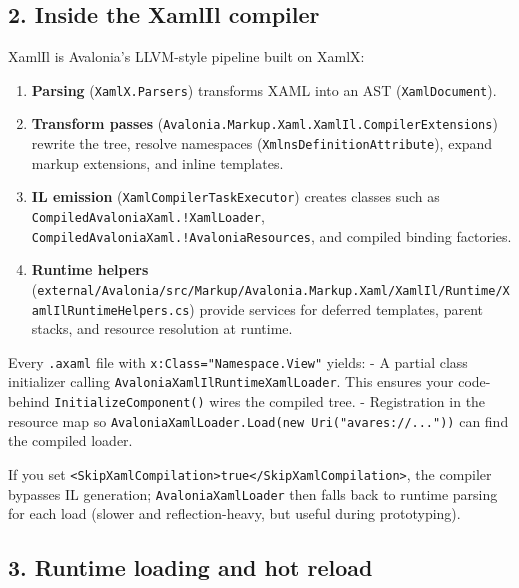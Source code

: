 \subsection{2. Inside the XamlIl
compiler}\label{inside-the-xamlil-compiler}

XamlIl is Avalonia's LLVM-style pipeline built on XamlX:

\begin{enumerate}
\def\labelenumi{\arabic{enumi}.}
\tightlist
\item
  \textbf{Parsing} (\passthrough{\lstinline!XamlX.Parsers!}) transforms
  XAML into an AST (\passthrough{\lstinline!XamlDocument!}).
\item
  \textbf{Transform passes}
  (\passthrough{\lstinline!Avalonia.Markup.Xaml.XamlIl.CompilerExtensions!})
  rewrite the tree, resolve namespaces
  (\passthrough{\lstinline!XmlnsDefinitionAttribute!}), expand markup
  extensions, and inline templates.
\item
  \textbf{IL emission}
  (\passthrough{\lstinline!XamlCompilerTaskExecutor!}) creates classes
  such as \passthrough{\lstinline"CompiledAvaloniaXaml.!XamlLoader"},
  \passthrough{\lstinline"CompiledAvaloniaXaml.!AvaloniaResources"}, and
  compiled binding factories.
\item
  \textbf{Runtime helpers}
  (\passthrough{\lstinline!external/Avalonia/src/Markup/Avalonia.Markup.Xaml/XamlIl/Runtime/XamlIlRuntimeHelpers.cs!})
  provide services for deferred templates, parent stacks, and resource
  resolution at runtime.
\end{enumerate}

Every \passthrough{\lstinline!.axaml!} file with
\passthrough{\lstinline!x:Class="Namespace.View"!} yields: - A partial
class initializer calling
\passthrough{\lstinline!AvaloniaXamlIlRuntimeXamlLoader!}. This ensures
your code-behind \passthrough{\lstinline!InitializeComponent()!} wires
the compiled tree. - Registration in the resource map so
\passthrough{\lstinline!AvaloniaXamlLoader.Load(new Uri("avares://..."))!}
can find the compiled loader.

If you set
\passthrough{\lstinline!<SkipXamlCompilation>true</SkipXamlCompilation>!},
the compiler bypasses IL generation;
\passthrough{\lstinline!AvaloniaXamlLoader!} then falls back to runtime
parsing for each load (slower and reflection-heavy, but useful during
prototyping).

\subsection{3. Runtime loading and hot
reload}\label{runtime-loading-and-hot-reload}

